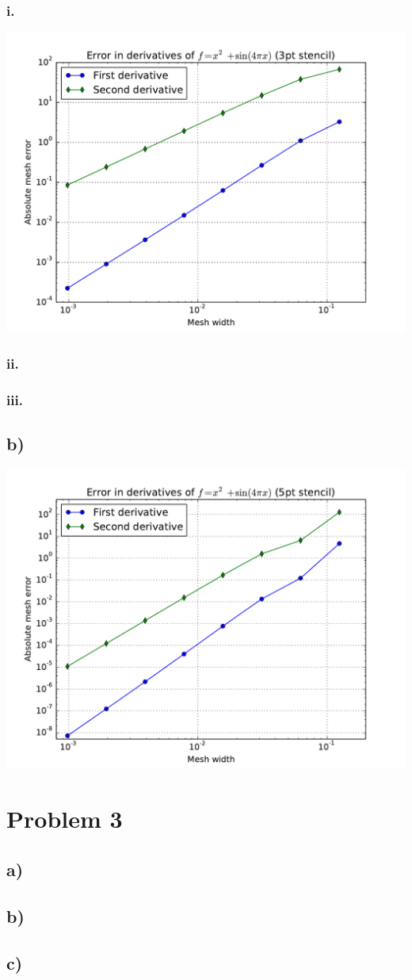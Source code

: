 \documentclass{article}
\begin{document}
\subsubsection*{i.}
\includegraphics[width=\linewidth]{3PtStencilError.pdf}
\subsubsection*{ii.}
\subsubsection*{iii.}
\subsection*{b)}
\includegraphics[width=\linewidth]{5PtStencilError.pdf}
\section*{Problem 3}
\subsection*{a)}
\subsection*{b)}
\subsection*{c)}
\end{document}
